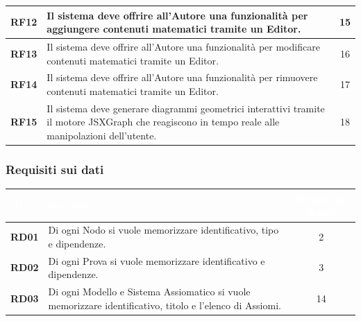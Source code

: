 \documentclass[12pt,a4paper]{article}
\begin{document}
\begin{table}[H]
\begin{tabularx}{\textwidth}{|l|X|c|}
        \hline
        \textbf{RF12} & Il sistema deve offrire all'Autore una funzionalità per aggiungere contenuti matematici tramite un Editor. & 15 \\
        \hline
        \rowcolor{CodeBg} \textbf{RF13} & Il sistema deve offrire all'Autore una funzionalità per modificare contenuti matematici tramite un Editor. & 16 \\
        \hline
        \textbf{RF14} & Il sistema deve offrire all'Autore una funzionalità per rimuovere contenuti matematici tramite un Editor. & 17 \\
        \hline
        \rowcolor{CodeBg} \textbf{RF15} & Il sistema deve generare diagrammi geometrici interattivi tramite il motore JSXGraph che reagiscono in tempo reale alle manipolazioni dell'utente. & 18 \\
        \hline
    \end{tabularx}
\end{table}

\subsubsection{Requisiti sui dati}
\begin{table}[H]
    \centering
    \small
    \begin{tabularx}{\textwidth}{|l|X|c|}
        \hline
        \rowcolor{PrimaryBlue} \textcolor{white}{\textbf{ID}} & \textcolor{white}{\textbf{Requisito}} & \textcolor{white}{\textbf{Origine (n. frase)}} \\
        \hline
        \textbf{RD01} & Di ogni Nodo si vuole memorizzare identificativo, tipo e dipendenze. & 2 \\
        \hline
        \rowcolor{CodeBg} \textbf{RD02} & Di ogni Prova si vuole memorizzare identificativo e dipendenze. & 3 \\
        \hline
        \textbf{RD03} & Di ogni Modello e Sistema Assiomatico si vuole memorizzare identificativo, titolo e l'elenco di Assiomi. & 14 \\
        \hline
    \end{tabularx}
\end{table}
\end{document}
